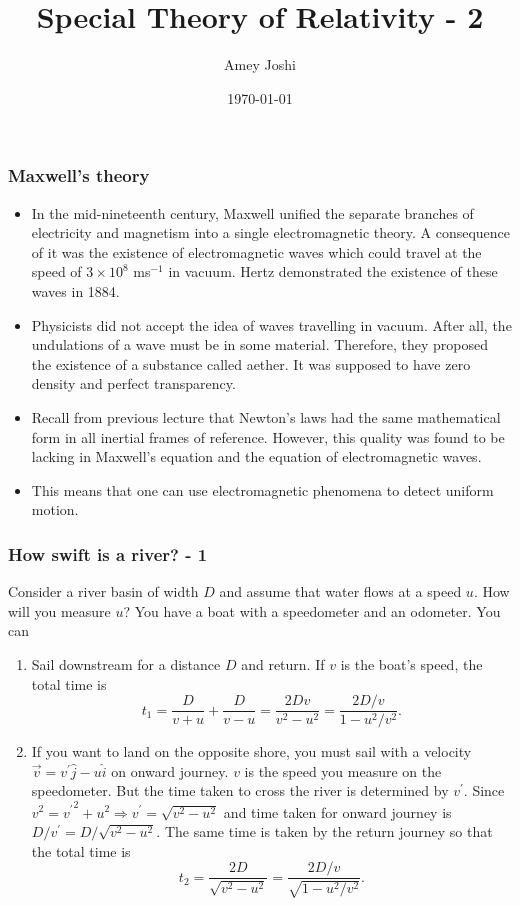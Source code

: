 \documentclass{beamer}
\title{Special Theory of Relativity - 2}
\author{Amey Joshi}
\date{\today}
\begin{document}
\begin{frame}
\titlepage
\end{frame}

\begin{frame}
\frametitle{Maxwell's theory}
\begin{itemize}
\item In the mid-nineteenth century, Maxwell unified the separate branches of
electricity and magnetism into a single electromagnetic theory. A consequence
of it was the existence of electromagnetic waves which could travel at the
speed of $3 \times 10^8$ ms${}^{-1}$ in vacuum. Hertz demonstrated the 
existence of these waves in 1884.
\item Physicists did not accept the idea of waves travelling in vacuum. After 
all, the undulations of a wave must be in some material. Therefore, they 
proposed the existence of a substance called aether. It was supposed to have
zero density and perfect transparency.
\item Recall from previous lecture that Newton's laws had the same mathematical
form in all inertial frames of reference. However, this quality was found to
be lacking in Maxwell's equation and the equation of electromagnetic waves.
\item This means that one can use electromagnetic phenomena to detect uniform
motion. 
\end{itemize}
\end{frame}

\begin{frame}
\frametitle{How swift is a river? - 1}
Consider a river basin of width $D$ and assume that water flows at a speed $u$.
How will you measure $u$? You have a boat with a speedometer and an odometer. 
You can
\begin{enumerate}
\item Sail downstream for a distance $D$ and return. If $v$ is the boat's speed,
the total time is
\begin{equation}\label{e1}
t_1 = \frac{D}{v + u} + \frac{D}{v - u} = \frac{2Dv}{v^2 - u^2} = 
\frac{2D/v}{1 - u^2/v^2}.
\end{equation}
\item If you want to land on the opposite shore, you must sail with a velocity
$\vec{v} = v^\prime\hat{j} - u\hat{i}$ on onward journey. $v$ is the speed you 
measure on the speedometer. But the time taken to cross the river is determined 
by $v^\prime$. Since $v^2 = {v^\prime}^2 + u^2 \Rightarrow v^\prime = 
\sqrt{v^2 - u^2}$ and time taken for onward journey is $D/v^\prime = 
D/\sqrt{v^2 - u^2}$. The same time is taken by the return journey so that the 
total time is
\begin{equation}\label{e2}
t_2 = \frac{2D}{\sqrt{v^2 - u^2}} = \frac{2D/v}{\sqrt{1 - u^2/v^2}}.
\end{equation}
\end{enumerate}
\end{frame}
\end{document}
